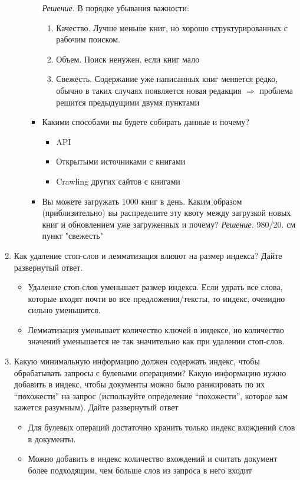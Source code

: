 \begin{enumerate}
\begin{enumerate}
\begin{itemize}
			\textit{Решение. }В порядке убывания важности:
			\begin{enumerate}
				\item Качество. Лучше меньше книг, но хорошо структурированных с рабочим поиском.
				\item Объем. Поиск ненужен, если книг мало
				\item Свежесть. Содержание уже написанных книг меняется редко, обычно в таких случаях появляется новая редакция $\Rightarrow$ проблема решится предыдущими двумя пунктами
			\end{enumerate}
			\item Какими способами вы будете собирать данные и почему?
			\begin{itemize}
				\item API
				\item Открытыми источниками с книгами
				\item Crawling других сайтов с книгами
			\end{itemize}
			\item Вы можете загружать 1000 книг в день. Каким образом (приблизительно) вы 
			распределите эту квоту между загрузкой новых книг и обновлением уже загруженных и
			почему?
			\textit{Решение.} 980/20. см пункт "свежесть"
		\end{itemize}
	\end{enumerate}
	
	\item  Как удаление стоп-слов и лемматизация влияют на размер индекса? Дайте	
	развернутый ответ.
	
	\begin{itemize}
		\item Удаление стоп-слов уменьшает размер индекса. Если удрать все слова, которые 
		входят почти во все предложения/тексты, то индекс, очевидно сильно уменьшится.
		\item Лемматизация уменьшает количество ключей в индексе, но количество значений 
		уменьшается не так значительно как при удалении стоп-слов.
	\end{itemize}
		
	\item Какую минимальную информацию должен содержать индекс, чтобы обрабатывать запросы с 
	булевыми операциями? Какую информацию нужно добавить в индекс, чтобы документы можно было 
	ранжировать по их “похожести” на запрос (используйте определение “похожести”, которое вам 
	кажется разумным). Дайте развернутый ответ
	
	\begin{itemize}
		\item Для булевых операций достаточно хранить только индекс вхождений слов в 
		документы.
		\item Можно добавить в индекс количество вхождений и считать документ более 
		подходящим, чем больше слов из запроса в него входит
	\end{itemize}
\end{enumerate}
